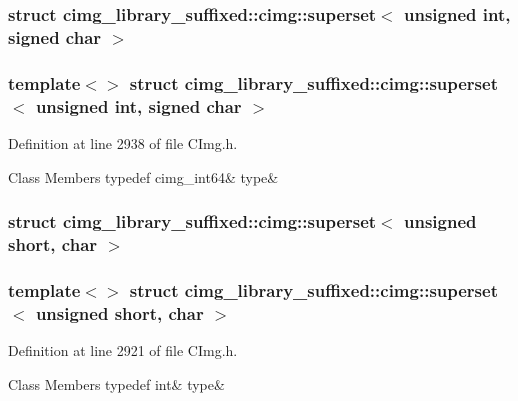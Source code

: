 \subsubsection{struct cimg\+\_\+library\+\_\+suffixed\+:\+:cimg\+:\+:superset$<$ unsigned int, signed char $>$}
\subsubsection*{template$<$$>$\newline
struct cimg\+\_\+library\+\_\+suffixed\+::cimg\+::superset$<$ unsigned int, signed char $>$}



Definition at line 2938 of file C\+Img.\+h.

\begin{DoxyFields}{Class Members}
\mbox{\label{namespacecimg__library__suffixed_1_1cimg_ae26b1cc91c36c62a9abd63a9e8a996da}} 
typedef cimg\_int64&
type&
\\
\hline

\end{DoxyFields}
\label{structcimg__library__suffixed_1_1cimg_1_1superset_3_01unsigned_01short_00_01char_01_4}
\subsubsection{struct cimg\+\_\+library\+\_\+suffixed\+:\+:cimg\+:\+:superset$<$ unsigned short, char $>$}
\subsubsection*{template$<$$>$\newline
struct cimg\+\_\+library\+\_\+suffixed\+::cimg\+::superset$<$ unsigned short, char $>$}



Definition at line 2921 of file C\+Img.\+h.

\begin{DoxyFields}{Class Members}
\mbox{\label{namespacecimg__library__suffixed_1_1cimg_af737d539d2d3ac2abec81687fdc82fd9}} 
typedef int&
type&
\\
\hline

\end{DoxyFields}
\label{structcimg__library__suffixed_1_1cimg_1_1superset_3_01unsigned_01short_00_01cimg__int64_01_4}
